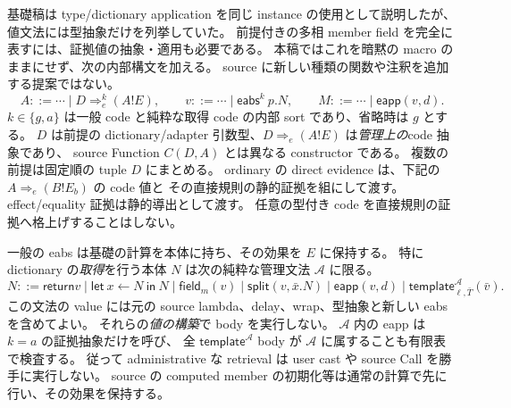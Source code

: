 \documentclass[11pt,a4paper]{article}
\newcommand{\Ret}{\mathsf{return}}
\begin{document}
基礎稿は type/dictionary application を同じ instance の使用として説明したが、
値文法には型抽象だけを列挙していた。
前提付きの多相 member field を完全に表すには、証拠値の抽象・適用も必要である。
本稿ではこれを暗黙の macro のままにせず、次の内部構文を加える。
source に新しい種類の関数や注釈を追加する提案ではない。
\[
 A::=\cdots\mid D\Rightarrow_{\!e}^{k}(A!E),\qquad
 v::=\cdots\mid\mathsf{eabs}^{k}\ p.N,\qquad
 M::=\cdots\mid\mathsf{eapp}(v,d).
\]
\(k\in\{g,a\}\) は一般 code と純粋な取得 code の内部 sort であり、省略時は \(g\) とする。
\(D\) は前提の dictionary/adapter 引数型、\(D\Rightarrow_e(A!E)\) は\emph{管理上の}code 抽象であり、
source Function \(C(D,A)\) とは異なる constructor である。
複数の前提は固定順の tuple \(D\) にまとめる。
ordinary の direct evidence は、下記の \(A\Rightarrow_e(B!E_b)\) の code 値と
その直接規則の静的証拠を組にして渡す。effect/equality 証拠は静的導出として渡す。
任意の型付き code を直接規則の証拠へ格上げすることはしない。

一般の eabs は基礎の計算を本体に持ち、その効果を \(E\) に保持する。
特に dictionary の\emph{取得}を行う本体 \(N\) は次の純粋な管理文法 \(\mathcal A\) に限る。
\[
 N::=\Ret v\mid\mathsf{let}\ x\leftarrow N\ \mathsf{in}\ N
   \mid\mathsf{field}_m(v)\mid\mathsf{split}(v,\bar x.N)
   \mid\mathsf{eapp}(v,d)\mid\mathsf{template}^{\mathcal A}_{\ell,\bar T}(\bar v).
\]
この文法の value には元の source lambda、delay、wrap、型抽象と新しい eabs を含めてよい。
それらの\emph{値の構築}で body を実行しない。
\(\mathcal A\) 内の eapp は \(k=a\) の証拠抽象だけを呼び、
全 \(\mathsf{template}^{\mathcal A}\) body が \(\mathcal A\) に属することも有限表で検査する。
従って administrative な retrieval は user cast や source Call を勝手に実行しない。
source の computed member の初期化等は通常の計算で先に行い、その効果を保持する。
\end{document}
